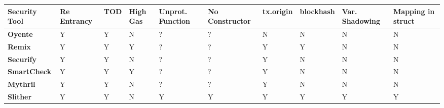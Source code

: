 \begin{table}[H]
	\caption{Comparison of vulnerabilities each tool is able to find. Slither is able to detect the most significant of the already exploited vulnerabilities along with more subtle ones which are not detectable by other tools.}
	\centering
	\setlength\LTleft{-1in}
	\setlength\LTright{-1in}
	\begin{longtable}{C{0.12\textwidth}
					  C{0.10\textwidth} C{0.10\textwidth}
					  C{0.10\textwidth} C{0.10\textwidth}
					  C{0.10\textwidth} C{0.11\textwidth}
					  C{0.10\textwidth} C{0.10\textwidth}
					  C{0.10\textwidth}}
		\hline
		\textbf{Security Tool} & 
		\textbf{Re Entrancy} & 
		\textbf{TOD} &  
		\textbf{High Gas} &
		\textbf{Unprot. Function} & 
		\textbf{No Constructor} & 
		\textbf{tx.origin} & 
		\textbf{blockhash} & 
		\textbf{Var. Shadowing} &
		\textbf{Mapping in struct}
		\\
		\hline
		\textbf{Oyente} &
			Y & Y & N & 
			? & ? & N & 
			N & N & N
			\\ \hline

		\textbf{Remix} &
			Y & Y & Y & 
			? & ? & Y & 
			Y & N & N 
			\\ \hline

		\textbf{Securify} &
			Y & Y & N & 
			? & ? & Y & 
			N & N & N 
			\\ \hline

		\textbf{SmartCheck} &
			Y & Y & Y & 
			? & ? & Y & 
			N & N & N 
			\\ \hline

		\textbf{Mythril} &
			Y & Y & N & 
			? & ? & Y & 
			N & N & N 
			\\ \hline

		\textbf{Slither} &
			Y & Y & N & 
			Y & Y & Y & 
			Y & Y & Y 
			\\ \hline
	\end{longtable}
	\label{table:slither}
\end{table}
